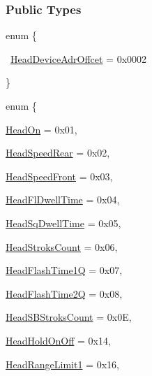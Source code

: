 \subsubsection*{Public Types}
\begin{DoxyCompactItemize}
\item 
enum \{ 
\begin{DoxyCompactItemize}
	\item\mbox{
	\hyperlink{classHeadSetting_a26c38b767aa2b7ab7291ef630eec5caeab0f78d4b529a6847e567515aca117a0c}{Head\+Device\+Adr\+Offcet}} = 0x0002
\end{DoxyCompactItemize}
 \}
\item 
enum \{ 
\begin{DoxyCompactItemize}
\item\mbox{\hyperlink{classHeadSetting_a937c9f57091b4015548d4d6cac973a32aa7d44b6745f1db6d62ee634fb39051dd}{Head\+On}} = 0x01, 
\item\mbox{\hyperlink{classHeadSetting_a937c9f57091b4015548d4d6cac973a32a0e44ce76891025c2b326675367082cc9}{Head\+Speed\+Rear}} = 0x02, 
\item\mbox{\hyperlink{classHeadSetting_a937c9f57091b4015548d4d6cac973a32a2e5f2f0dba724f0715c87f46777633bd}{Head\+Speed\+Front}} = 0x03, 
\item\mbox{\hyperlink{classHeadSetting_a937c9f57091b4015548d4d6cac973a32a7eb5d5b1e85b9532bad9f8f3fd16bd34}{Head\+Fl\+Dwell\+Time}} = 0x04, 
\item\mbox{\hyperlink{classHeadSetting_a937c9f57091b4015548d4d6cac973a32ab174598de937b97c20b86c74d19d8aae}{Head\+Sq\+Dwell\+Time}} = 0x05, 
\item\mbox{\hyperlink{classHeadSetting_a937c9f57091b4015548d4d6cac973a32aca1ab3180a5e98e4eddfe21f1eb3405d}{Head\+Stroks\+Count}} = 0x06, 
\item\mbox{\hyperlink{classHeadSetting_a937c9f57091b4015548d4d6cac973a32a07205ea7208f6366f78a2d31ab6e0f9a}{Head\+Flash\+Time1Q}} = 0x07, 
\item\mbox{\hyperlink{classHeadSetting_a937c9f57091b4015548d4d6cac973a32a27abbc3575dd924d014bfe5969d58156}{Head\+Flash\+Time2Q}} = 0x08, 
\item\mbox{\hyperlink{classHeadSetting_a937c9f57091b4015548d4d6cac973a32a6a8b426de299d5ba820db429caba6f31}{Head\+S\+B\+Stroks\+Count}} = 0x0E, 
\item\mbox{\hyperlink{classHeadSetting_a937c9f57091b4015548d4d6cac973a32acc6942cb582ba862bd75c1ed499a5941}{Head\+Hold\+On\+Off}} = 0x14, 
\item\mbox{\hyperlink{classHeadSetting_a937c9f57091b4015548d4d6cac973a32a7c1406e9274cd587eab6956c0677d194}{Head\+Range\+Limit1}} = 0x16, 

\end{DoxyCompactItemize}
\end{DoxyCompactItemize}
